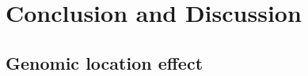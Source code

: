 \newpage
\chapter{Conclusion and Discussion}\label{discussion}



\section{Genomic location effect}\label{discussion:gle}
